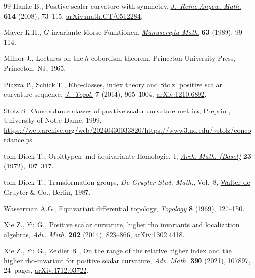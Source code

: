 \documentclass[11pt]{article}
\numberwithin{equation}{section}
\numberwithin{equation}{section}
\begin{document}
	
\begin{thebibliography}{99}
Hanke B., Positive scalar curvature with symmetry,
 \href{https://doi.org/10.1515/CRELLE.2008.003}{\textit{J.~Reine Angew.
 Math.}} \textbf{614} (2008), 73--115,
 \href{http://arxiv.org/abs/math.GT/0512284}{arXiv:math.GT/0512284}.

Mayer K.H., {$G$}-invariante {M}orse-{F}unktionen,
 \href{https://doi.org/10.1007/BF01173705}{\textit{Manuscripta Math.}}
 \textbf{63} (1989), 99--114.

Milnor J., Lectures on the {$h$}-cobordism theorem, Princeton University Press,
 Princeton, NJ, 1965.

Piazza P., Schick T., Rho-classes, index theory and {S}tolz' positive scalar
 curvature sequence,
 \href{https://doi.org/10.1112/jtopol/jtt048}{\textit{J.~Topol.}} \textbf{7}
 (2014), 965--1004, \href{http://arxiv.org/abs/1210.6892}{arXiv:1210.6892}.

Stolz S., Concordance classes of positive scalar curvature metrics, {P}reprint, University of Notre Dame, 1999, \url{https://web.archive.org/web/20240430033820/https://www3.nd.edu/~stolz/concordance.ps}.

tom Dieck T., Orbittypen und \"aquivariante {H}omologie.~{I},
 \href{https://doi.org/10.1007/BF01304886}{\textit{Arch. Math. (Basel)}}
 \textbf{23} (1972), 307--317.

tom Dieck T., Transformation groups, \textit{De Gruyter Stud. Math.}, Vol.~8,
 \href{https://doi.org/10.1515/9783110858372.312}{Walter de Gruyter \& Co.},
 Berlin, 1987.

Wasserman A.G., Equivariant differential topology,
 \href{https://doi.org/10.1016/0040-9383(69)90005-6}{\textit{Topology}}
 \textbf{8} (1969), 127--150.

Xie Z., Yu G., Positive scalar curvature, higher rho invariants and
 localization algebras,
 \href{https://doi.org/10.1016/j.aim.2014.06.001}{\textit{Adv. Math.}}
 \textbf{262} (2014), 823--866,
 \href{http://arxiv.org/abs/1302.4418}{arXiv:1302.4418}.

Xie Z., Yu G., Zeidler R., On the range of the relative higher index and the
 higher rho-invariant for positive scalar curvature,
 \href{https://doi.org/10.1016/j.aim.2021.107897}{\textit{Adv. Math.}}
 \textbf{390} (2021), 107897, 24~pages,
 \href{http://arxiv.org/abs/1712.03722}{arXiv:1712.03722}.

\end{thebibliography}
\end{document}
